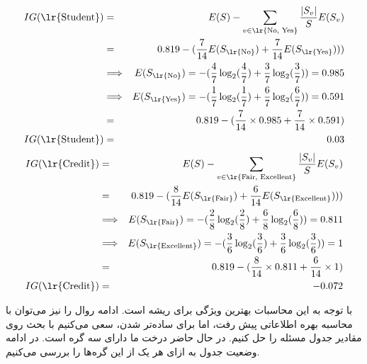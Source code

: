 \documentclass{article}
\begin{document}
\begin{eqnarray*}
    IG(\text{\lr{Student}}) & = & E(S) - \sum_{v \in {\text{\lr{No, Yes}}}} \frac{|S_v|}{S} E(S_v) \\
    & = & 0.819 - (\frac{7}{14} E(S_{\text{\lr{No}}}) + \frac{7}{14} E(S_{\text{\lr{Yes}}})))\\
    & \Longrightarrow & E(S_{\text{\lr{No}}}) = -(\frac{4}{7} \log_2(\frac{4}{7}) + \frac{3}{7} \log_2(\frac{3}{7})) = 0.985 \\
    & \Longrightarrow & E(S_{\text{\lr{Yes}}}) = -(\frac{1}{7} \log_2(\frac{1}{7}) + \frac{6}{7} \log_2(\frac{6}{7})) = 0.591 \\
    & = & 0.819 - (\frac{7}{14} \times 0.985 + \frac{7}{14} \times 0.591 )\\
    IG(\text{\lr{Student}}) & = & 0.03
\end{eqnarray*}
\begin{eqnarray*}
    IG(\text{\lr{Credit}}) & = & E(S) - \sum_{v \in {\text{\lr{Fair, Excellent}}}} \frac{|S_v|}{S} E(S_v) \\
    & = & 0.819 - (\frac{8}{14} E(S_{\text{\lr{Fair}}}) + \frac{6}{14} E(S_{\text{\lr{Excellent}}})))\\
    & \Longrightarrow & E(S_{\text{\lr{Fair}}}) = -(\frac{2}{8} \log_2(\frac{2}{8}) + \frac{6}{8} \log_2(\frac{6}{8})) = 0.811 \\
    & \Longrightarrow & E(S_{\text{\lr{Excellent}}}) = -(\frac{3}{6} \log_2(\frac{3}{6}) + \frac{3}{6} \log_2(\frac{3}{6})) = 1 \\
    & = & 0.819 - (\frac{8}{14} \times 0.811 + \frac{6}{14} \times 1 )\\
    IG(\text{\lr{Credit}}) & = & -0.072
\end{eqnarray*}

با توجه به این محاسبات بهترین ویژگی برای ریشه  است. ادامه روال را نیز می‌توان با محاسبه‌
بهره اطلاعاتی پیش رفت، اما برای ساده‌تر شدن، سعی می‌کنیم با بحث روی مقادیر جدول مسئله را حل کنیم.
در حال حاضر درخت ما دارای سه گره است. در ادامه وضعیت جدول به ازای هر یک از این گره‌ها را بررسی می‌کنیم.
\end{document}
